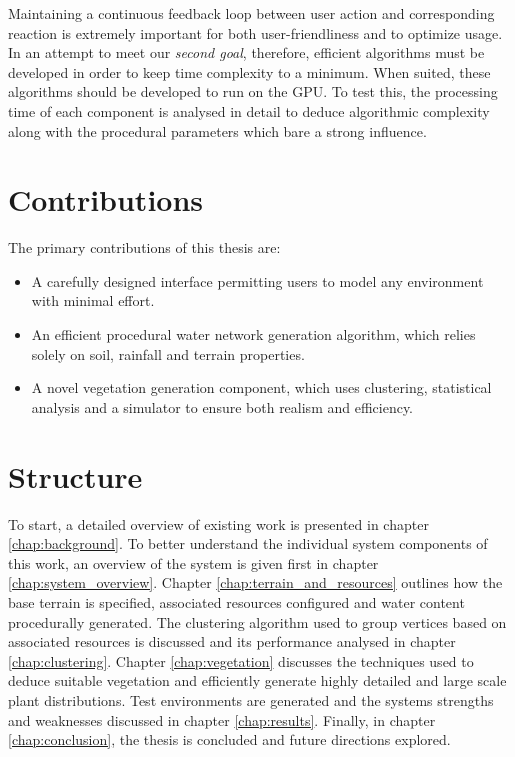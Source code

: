 Maintaining a continuous feedback loop between user action and corresponding reaction is extremely important for both user-friendliness and to optimize usage. In an attempt to meet our \textit{second goal}, therefore, efficient algorithms must be developed in order to keep time complexity to a minimum. When suited, these algorithms should be developed to run on the GPU. To test this, the processing time of each component is analysed in detail to deduce algorithmic complexity along with the procedural parameters which bare a strong influence. \\

\section{Contributions}

The primary contributions of this thesis are:
\begin{itemize}
\item A carefully designed interface permitting users to model any environment with minimal effort.
\item An efficient procedural water network generation algorithm, which relies solely on soil, rainfall and terrain properties.
\item A novel vegetation generation component, which uses clustering, statistical analysis and a simulator to ensure both realism and efficiency.
\end{itemize}

\section{Structure}

To start, a detailed overview of existing work is presented in chapter \ref{chap:background}. To better understand the individual system components of this work, an overview of the system is given first in chapter \ref{chap:system_overview}. Chapter \ref{chap:terrain_and_resources} outlines how the base terrain is specified, associated resources configured and water content procedurally generated. The clustering algorithm used to group vertices based on associated resources is discussed and its performance analysed in chapter \ref{chap:clustering}. Chapter \ref{chap:vegetation} discusses the techniques used to deduce suitable vegetation and efficiently generate highly detailed and large scale plant distributions. Test environments are generated and the systems strengths and weaknesses discussed in chapter \ref{chap:results}. Finally, in chapter \ref{chap:conclusion}, the thesis is concluded and future directions explored.
